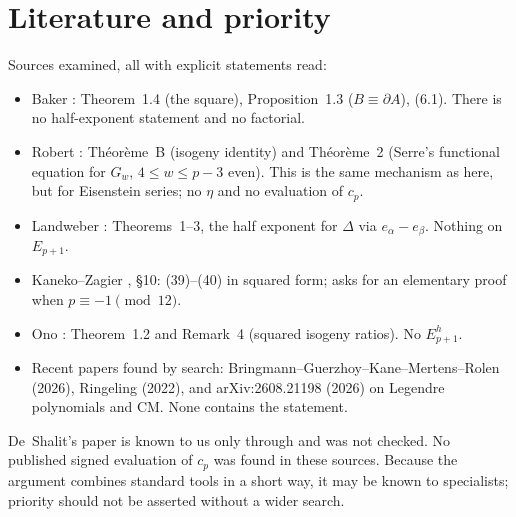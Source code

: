 \documentclass[11pt,a4paper]{article}
\numberwithin{equation}{section}
\theoremstyle{definition}
\theoremstyle{remark}
\begin{document}
\section{Literature and priority}\label{sec:lit}
Sources examined, all with explicit statements read:
\begin{itemize}
\item Baker \cite{Baker98}: Theorem~1.4 (the square), Proposition~1.3 ($B\equiv\partial A$),
(6.1). There is no half-exponent statement and no factorial.
\item Robert \cite{Robert80}: Th\'eor\`eme~B (isogeny identity) and Th\'eor\`eme~2 (Serre's
functional equation for $G_w$, $4\le w\le p-3$ even). This is the same mechanism as here,
but for Eisenstein series; no $\eta$ and no evaluation of $c_p$.
\item Landweber \cite{Landweber88}: Theorems~1--3, the half exponent for $\Delta$ via
$e_\alpha-e_\beta$. Nothing on $E_{p+1}$.
\item Kaneko--Zagier \cite{KZ98}, \S10: (39)--(40) in squared form; asks for an elementary
proof when $p\equiv-1\pmod{12}$.
\item Ono \cite{Ono25}: Theorem~1.2 and Remark~4 (squared isogeny ratios). No $E_{p+1}^h$.
\item Recent papers found by search: Bringmann--Guerzhoy--Kane--Mertens--Rolen (2026),
Ringeling (2022), and arXiv:2608.21198 (2026) on Legendre polynomials and CM. None contains the statement.
\end{itemize}
De~Shalit's paper is known to us only through \cite{KZ98} and was not checked. No published
signed evaluation of $c_p$ was found in these sources. Because the argument combines
standard tools in a short way, it may be known to specialists; priority should not be
asserted without a wider search.
\end{document}
